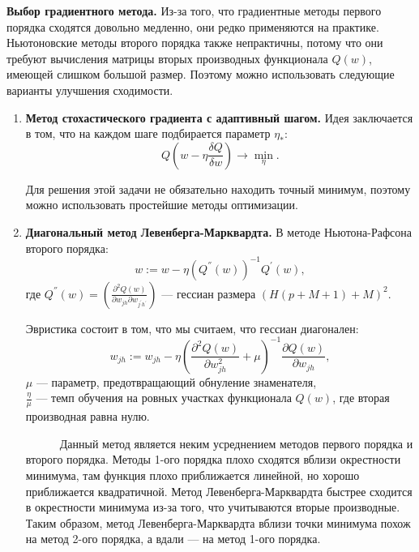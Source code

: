 \documentclass{article}
\begin{document}
	\textbf{Выбор градиентного метода.} Из-за того, что градиентные методы первого порядка сходятся довольно медленно, они редко применяются на практике. Ньютоновские методы второго порядка также непрактичны, потому что они требуют вычисления матрицы вторых производных функционала $Q(w)$, имеющей слишком большой размер. Поэтому можно использовать следующие варианты улучшения сходимости.
	\begin{enumerate}
		\item \textbf{Метод стохастического градиента с адаптивный шагом.} Идея заключается в том, что на каждом шаге подбирается параметр $\eta_{*}$:
		\begin{equation*}
			Q(w - \eta \frac{\delta Q}{\delta w}) \rightarrow \min_\eta.
		\end{equation*}
		
		Для решения этой задачи не обязательно находить точный минимум, поэтому можно использовать простейшие методы оптимизации.
		\item \textbf{Диагональный метод Левенберга-Марквардта.}
		В методе Ньютона-Рафсона второго порядка:
		\begin{equation*}
			w := w - \eta (Q^{''}(w))^{-1} Q^{'}(w),
		\end{equation*}
		где $Q^{''}(w) = \left( \frac{\partial^2 Q(w) }{\partial w_{jh} \partial w_{j^{'}h^{'}}}   \right)$ --- гессиан размера $(H(p+M+1) + M)^2$.
		
		Эвристика состоит в том, что мы считаем, что гессиан диагонален:
		\begin{equation*}
			w_{jh} := w_{jh} - \eta \left(  \frac{\partial^2 Q(w) }{\partial w_{jh}^2} + \mu  \right) ^{-1} \frac{\partial Q(w) }{\partial w_{jh}}, 
		\end{equation*} 
		$\mu$ --- параметр, предотвращающий обнуление знаменателя, \\
		$\frac{\eta}{\mu}$ --- темп обучения на ровных участках функционала $Q(w)$, где вторая производная равна нулю.
		
		~~~~~~Данный метод является неким усреднением методов первого порядка и второго порядка. Методы 1-ого порядка плохо сходятся вблизи окрестности минимума, там функция плохо приближается линейной, но хорошо приближается квадратичной. Метод Левенберга-Марквардта быстрее сходится в окрестности минимума из-за того, что учитываются вторые производные. Таким образом, метод Левенберга-Марквардта вблизи точки минимума похож на метод 2-ого порядка, а вдали --- на метод 1-ого порядка.
	\end{enumerate}
	
\end{document}
